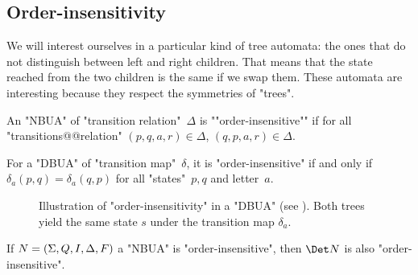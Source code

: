 \documentclass[a4paper,UKenglish,cleveref, autoref, thm-restate]{lipics-v2021}
\begin{document}
\subsection{Order-insensitivity}\label{sec:OrderAutomata}

We will interest ourselves in a particular kind of tree automata: the ones that do not distinguish between left and right children.
That means that the state reached from the two children is the same if we swap them. These automata are
interesting because they respect the symmetries of "trees".

\begin{definition}
	\AP An "NBUA" of "transition relation"~$\Delta$ is ""order-insensitive"" if for all "transitions@@relation" $(p,q,a,r) \in \Delta$,
	$(q,p,a,r) \in \Delta$.
\end{definition}

\begin{remark}\label{def:order-insensitive}
	For a "DBUA" of "transition map"~$\delta$, it is "order-insensitive" if and only if
	$\delta_a (p,q) = \delta_a (q,p)$ for all "states"~$p,q$ and letter~$a$.
\end{remark}


\begin{figure}[h]
	\centering
	\caption{Illustration of "order-insensitivity" in a "DBUA" (see ).
		Both trees yield the same state $s$ under the transition map $\delta_a$.}
	\label{fig:order-insensitivity}
\end{figure}



\begin{lemma}
	If $N = (\Sigma, Q, I, \Delta, F)$ a "NBUA" is "order-insensitive", then $\Det N$ is also "order-insensitive".
\end{lemma}
\end{document}
